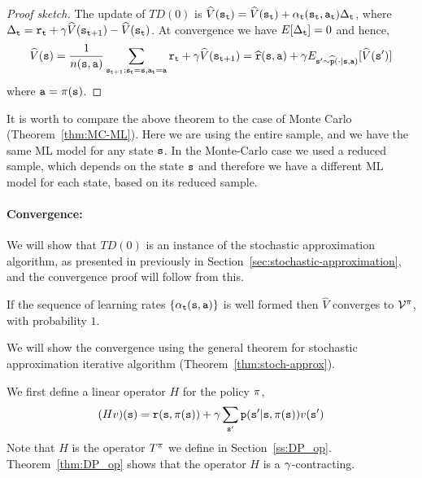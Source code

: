 \begin{proof}[Proof sketch]
The update of $TD(0)$ is
$\widehat{V}({\tt s}_{\tt t})=\widehat{V}({\tt s}_{\tt t})+\alpha_{\tt t}({\tt s}_{\tt t},{\tt a}_{\tt t})\Delta_{\tt t}$,
where $\Delta_{\tt t}={\tt r}_{\tt t}+\gamma
\widehat{V}({\tt s}_{{\tt t}+1})-\widehat{V}({\tt s}_{\tt t})$. At
convergence we have $E[\Delta_{\tt t}]=0$ and hence,
\[
\widehat{V}({\tt s})=\frac{1}{n({\tt s},{\tt a})}\sum_{{\tt s}_{{\tt t}+1}:{\tt s}_{\tt t}={\tt s},{\tt a}_{\tt t}={\tt a}}
{\tt r}_{\tt t}+\gamma
\widehat{V}({\tt s}_{{\tt t}+1})=\widehat{{\tt r}}({\tt s},{\tt a})+\gamma
E_{{\tt s}'\sim
\widehat{{\tt p}}(\cdot|{\tt s},{\tt a})}[\widehat{V}({\tt s}')]
\]
where ${\tt a}=\pi({\tt s})$.
\end{proof}

It is worth to compare the above theorem to the case of Monte Carlo
(Theorem~\ref{thm:MC-ML}). Here we are using the entire sample, and
we have the same ML model for any state ${\tt s}$. In the Monte-Carlo
case we used a reduced sample, which depends on the state ${\tt s}$
and therefore we have a different ML model for each state, based on
its reduced sample.

\paragraph{Convergence:} 
We will show that $TD(0)$ is an
instance of the stochastic approximation algorithm, as presented in
previously in Section~\ref{sec:stochastic-approximation}, and the
convergence proof will follow from this.

\begin{theorem}[Convergence $TD(0)$]
\label{thm:TD0-conrg} 
If the sequence of learning rates $\{\alpha_{\tt t}({\tt s},{\tt a})\}$ is well formed then $\widehat{V}$ converges
to $\mathcal{V}^\pi$, with probability $1$.
\end{theorem}

We will show the convergence using the general theorem for
stochastic approximation iterative algorithm
(Theorem~\ref{thm:stoch-approx}).

We first define a linear operator $H$ for the policy $\pi$,
\[
(Hv)({\tt s})={\tt r}({\tt s},\pi({\tt s}))+\gamma\sum_{{\tt s}'}{\tt p}({\tt s}'|{\tt s},\pi({\tt s}))v({\tt s}')
\]
Note that $H$ is the operator $T^\pi$ we define in
Section~\ref{ss:DP_op}. Theorem~\ref{thm:DP_op} shows that the operator $H$ is a $\gamma$-contracting.

